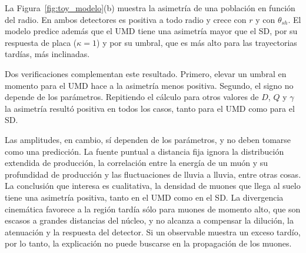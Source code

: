La Figura~\ref{fig:toy_modelo}(b) muestra la asimetría de una población en función del radio. En ambos detectores es positiva a todo radio y crece con $r$ y con $\theta_{sh}$. El modelo predice además que el UMD tiene una asimetría mayor que el SD, por su respuesta de placa ($\kappa=1$) y por su umbral, que es más alto para las trayectorias tardías, más inclinadas.

Dos verificaciones complementan este resultado. Primero, elevar un umbral en momento para el UMD hace a la asimetría menos positiva. Segundo, el signo no depende de los parámetros. Repitiendo el cálculo para otros valores de $D$, $Q$ y $\gamma$ la asimetría resultó positiva en todos los casos, tanto para el UMD como para el SD.

Las amplitudes, en cambio, sí dependen de los parámetros, y no deben tomarse como una predicción. La fuente puntual a distancia fija ignora la distribución extendida de producción, la correlación entre la energía de un muón y su profundidad de producción y las fluctuaciones de lluvia a lluvia, entre otras cosas. La conclusión que interesa es cualitativa, la densidad de muones que llega al suelo tiene una asimetría positiva, tanto en el UMD como en el SD. La divergencia cinemática favorece a la región tardía sólo para muones de momento alto, que son escasos a grandes distancias del núcleo, y no alcanza a compensar la dilución, la atenuación y la respuesta del detector. Si un observable muestra un exceso tardío, por lo tanto, la explicación no puede buscarse en la propagación de los muones. 

\newpage